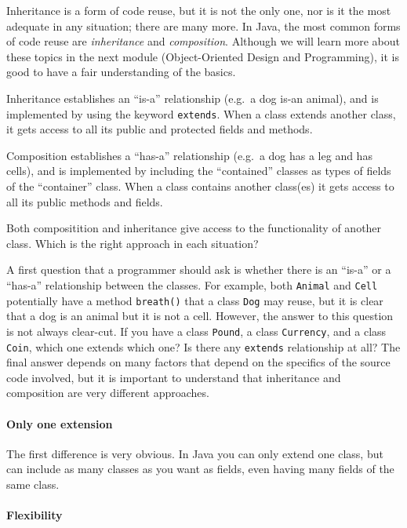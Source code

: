 Inheritance is a form of code reuse, but it is not the only one, nor
is it the most adequate in any situation; there are many more. In
Java, the most common forms of code reuse are \emph{inheritance} and
\emph{composition}. Although we will learn more about these topics in
the next module (Object-Oriented Design and Programming), it is good
to have a fair understanding of the basics. 

Inheritance establishes an ``is-a'' relationship (e.g.~a dog is-an 
animal), and is implemented by
using the keyword \verb+extends+. When a class extends another class,
it gets access to all its public and protected fields and methods. 

Composition establishes a ``has-a'' relationship (e.g.~a dog has a leg
and has cells), and is implemented by including the ``contained''
classes as types of fields of the ``container'' class.  When a class
contains another class(es) it gets access to all its public methods
and fields. 

Both compositition and inheritance give access to the functionality of
another class. Which is the right approach in each situation? 

A first
question that a programmer should ask is whether there is an ``is-a''
or a ``has-a'' relationship between the classes. For example, both
\verb+Animal+ and \verb+Cell+ potentially have a method
\verb+breath()+ that a class \verb+Dog+ may reuse, but it is clear
that a dog is an animal but it is not a cell. However, the answer to
this question is not
always clear-cut. If you have a class \verb+Pound+, a class
\verb+Currency+, and a class \verb+Coin+, which one extends which one?
Is there any \verb+extends+ relationship at all? The final answer
depends on many factors that depend on the specifics of the source
code involved, but it is important to understand that inheritance and
composition are very different approaches. 

\paragraph{Only one extension}
\label{sec:only-one-extension}

The first difference is very obvious. In Java you can only extend one
class, but can include as many classes as you want as fields, even
having many fields of the same class. 

\paragraph{Flexibility }
\label{sec:flexibility-}

